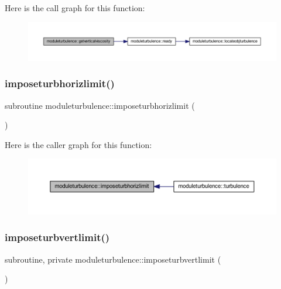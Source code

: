 Here is the call graph for this function\+:\nopagebreak
\begin{figure}[H]
\begin{center}
\leavevmode
\includegraphics[width=350pt]{namespacemoduleturbulence_a2ef11327f7c8ee6d8580c79c1a68bbdc_cgraph}
\end{center}
\end{figure}
\mbox{\label{namespacemoduleturbulence_a350c5c3bf3571f6247e3278025c35a0c}} 
\subsubsection{\texorpdfstring{imposeturbhorizlimit()}{imposeturbhorizlimit()}}
{\footnotesize\ttfamily subroutine moduleturbulence\+::imposeturbhorizlimit (\begin{DoxyParamCaption}{ }\end{DoxyParamCaption})\hspace{0.3cm}{\ttfamily [private]}}

Here is the caller graph for this function\+:\nopagebreak
\begin{figure}[H]
\begin{center}
\leavevmode
\includegraphics[width=350pt]{namespacemoduleturbulence_a350c5c3bf3571f6247e3278025c35a0c_icgraph}
\end{center}
\end{figure}
\mbox{\label{namespacemoduleturbulence_a5f1e04626a1dd3845c37639bd960e2e6}} 
\subsubsection{\texorpdfstring{imposeturbvertlimit()}{imposeturbvertlimit()}}
{\footnotesize\ttfamily subroutine, private moduleturbulence\+::imposeturbvertlimit (\begin{DoxyParamCaption}{ }\end{DoxyParamCaption})\hspace{0.3cm}{\ttfamily [private]}}

